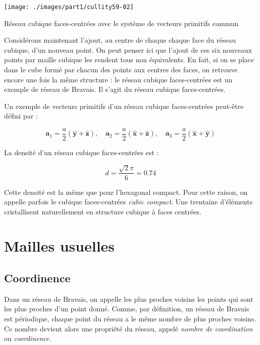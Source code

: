 \begin{marginfigure}
    \texttt{[image: ./images/part1/cullity59-02]}
    \caption{Réseau cubique faces-centrées avec le système de vecteurs primitifs commun}
    \label{fig:fcc}
\end{marginfigure}

Considérons maintenant l'ajout, au centre de chaque chaque face du réseau cubique, d'un nouveau point. On peut penser ici que l'ajout de ces six nouveaux points par maille cubique les rendent tous non équivalents. En fait, si on se place dans le cube formé par chacun des points aux centres des faces, on retrouve encore une fois la même structure : le réseau cubique faces-centrées est un exemple de réseau de Bravais. Il s'agit du réseau cubique faces-centrées.

Un exemple de vecteurs primitifs d'un réseau cubique faces-centrées peut-être défini par :

\begin{equation}
\mathbf{a}_1 = \frac{a}{2}(\mathbf{\hat{y}}+\mathbf{\hat{z}}),
\quad
\mathbf{a}_2 = \frac{a}{2}(\mathbf{\hat{x}}+\mathbf{\hat{z}}),
\quad
\mathbf{a}_3 = \frac{a}{2}(\mathbf{\hat{x}}+\mathbf{\hat{y}})
\end{equation}

La densité d'un réseau cubique faces-centrées est :

\begin{equation}
d = \frac{\sqrt{2}\pi}{6} = 0.74
\end{equation}

Cette densité est la même que pour l'hexagonal compact. Pour cette raison, on appelle parfois le cubique faces-centrées \emph{cubic compact}. Une trentaine d'éléments cristallisent naturellement en structure cubique à faces centrées.

\section{Mailles usuelles}
\subsection{Coordinence}

Dans un réseau de Bravais, on appelle les plus proches voisins les points qui sont les plus proches d'un point donné. Comme, par définition, un réseau de Bravais est périodique, chaque point du réseau a le même nombre de plus proches voisins. Ce nombre devient alors une propriété du réseau, appelé \emph{nombre de coordination} ou \emph{coordinence}.

